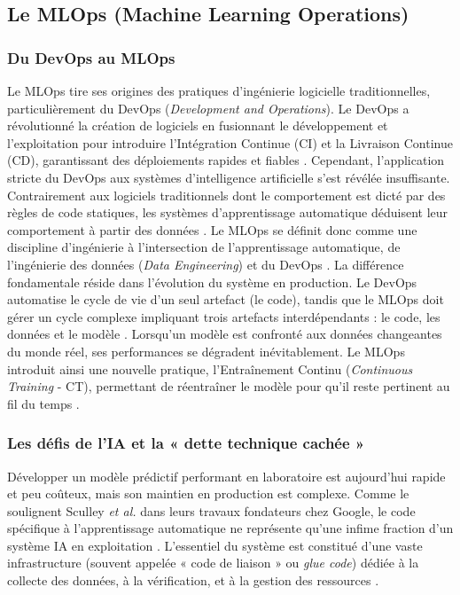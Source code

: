 \subsection{Le MLOps (Machine Learning Operations)}

\subsubsection{Du DevOps au MLOps }
Le MLOps tire ses origines des pratiques d'ingénierie logicielle traditionnelles, particulièrement du DevOps (\textit{Development and Operations}). Le DevOps a révolutionné la création de logiciels en fusionnant le développement et l'exploitation pour introduire l'Intégration Continue (CI) et la Livraison Continue (CD), garantissant des déploiements rapides et fiables \cite{85}. Cependant, l'application stricte du DevOps aux systèmes d'intelligence artificielle s'est révélée insuffisante. Contrairement aux logiciels traditionnels dont le comportement est dicté par des règles de code statiques, les systèmes d'apprentissage automatique déduisent leur comportement à partir des données \cite{85}. Le MLOps se définit donc comme une discipline d'ingénierie à l'intersection de l'apprentissage automatique, de l'ingénierie des données (\textit{Data Engineering}) et du DevOps \cite{85}. La différence fondamentale réside dans l'évolution du système en production. Le DevOps automatise le cycle de vie d'un seul artefact (le code), tandis que le MLOps doit gérer un cycle complexe impliquant trois artefacts interdépendants : le code, les données et le modèle \cite{74, 85}. Lorsqu'un modèle est confronté aux données changeantes du monde réel, ses performances se dégradent inévitablement. Le MLOps introduit ainsi une nouvelle pratique, l'Entraînement Continu (\textit{Continuous Training} - CT), permettant de réentraîner le modèle pour qu'il reste pertinent au fil du temps \cite{74, 84}.

\subsubsection{Les défis de l'IA et la « dette technique cachée »}
Développer un modèle prédictif performant en laboratoire est aujourd'hui rapide et peu coûteux, mais son maintien en production est complexe. Comme le soulignent Sculley \textit{et al.} dans leurs travaux fondateurs chez Google, le code spécifique à l'apprentissage automatique ne représente qu'une infime fraction d'un système IA en exploitation \cite{82}. L'essentiel du système est constitué d'une vaste infrastructure (souvent appelée « code de liaison » ou \textit{glue code}) dédiée à la collecte des données, à la vérification, et à la gestion des ressources \cite{82}.

